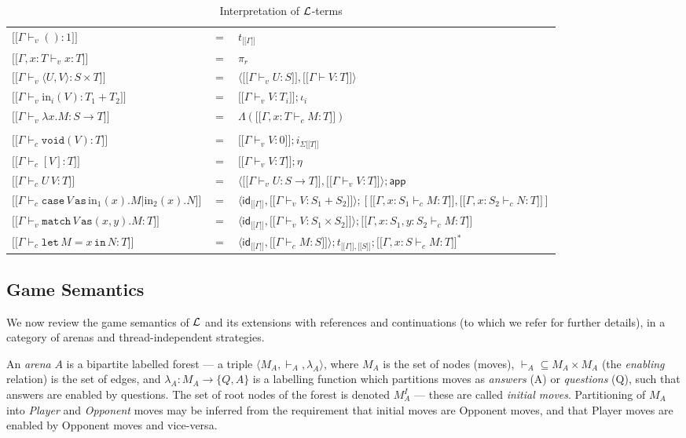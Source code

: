 \documentclass{eptcs}
\def\[{\ensuremath{[ \! [}}
\def\]{\ensuremath{] \! ]}}
\def\L{{\cal{L}}}
\newcommand{\cse}{{\mathtt{case}}}
\newcommand{\as}{{\mathtt{as}}}
\newcommand{\void}{{\mathtt{void}}}
\newcommand{\match}{{\mathtt{match}}}
\newcommand{\lett}{{\mathtt{let}}}
\newcommand{\spc}{\hspace{2pt}}
\newcommand{\inj}{\mathrm{in}}
\newcommand{\com}{{{1}}}
\newcommand{\id}{{\mathsf{id}}}
\newcommand{\app}{{\mathsf{app}}}
\newcommand{\inn}{{{\mathtt{in}}}}
\begin{document}
\begin{table}

\begin{tabular}{l c l}
$\[\Gamma \vdash_v ():\com\]$&$ =$&$ t_{\[\Gamma\]}$\\
$ \[\Gamma,x:T \vdash_v x:T\]$&$ = $&$\pi_r$\\ 
$\[\Gamma \vdash_v \langle U,V \rangle:   S\times T\]$&$ =$ &  $\langle \[\Gamma \vdash_v U:S \], \[\Gamma \vdash V:T\]\rangle$\\
$\[\Gamma \vdash_v \inj_i(V):T_1+ T_2\]$&$ =$&$ \[\Gamma \vdash_v V:T_i\];\iota_i$\\
$\[\Gamma \vdash_v \lambda x.M:S \rightarrow T\]$&$ =$&$ \Lambda(\[\Gamma,x:T \vdash_c  M:T\])$\\
\\
$\[\Gamma \vdash_c \void(V):T\]$&$ = $&$\[\Gamma \vdash_v V:0\];i_{\Sigma\[T\]}$\\
$\[\Gamma \vdash_c [V]:T\]$&$ = $&$\[\Gamma \vdash_v V:T\];\eta$\\
 $\[\Gamma \vdash_c U\spc V:T\]$&$ =$&$ \langle \[\Gamma \vdash_v U:S \rightarrow T\], \[\Gamma \vdash_v V:T\]\rangle;\app$\\
$\[\Gamma \vdash_c\cse \spc V\spc \as\spc \inj_1(x).M|\inj_2(x).N\]$&$ =$&$ \langle \id_{\[\Gamma\]}, \[\Gamma \vdash_v V:S_1 +S_2\]\rangle;[\[\Gamma,x:S_1 \vdash_c M:T\],\[\Gamma,x:S_2 \vdash_c N:T\]]$   \\
 $\[\Gamma \vdash_v \match \spc V\spc \as (x,y).M:T\]$&$ = $&$\langle\id_{\[\Gamma\]}, \[\Gamma \vdash_v V:S_1 \times S_2\]\rangle;\[\Gamma,x:S_1,y:S_2\vdash_c M:T\]$  \\
 $\[\Gamma \vdash_c \lett \spc M = x\spc \inn\spc N:T\]$&$ =$&$ \langle \id_{\[\Gamma\]},\[\Gamma \vdash_c M:S\]\rangle;t_{\[\Gamma\],\[S\]};\[\Gamma,x:S \vdash_c M:T\]^*$\\  
\end{tabular}
\caption{Interpretation of $\L$-terms}
\end{table}

\subsection{Game Semantics}
We now review the game semantics of $\L$ and its extensions with references \cite{AHM} and continuations \cite{LT} (to which we refer for further details), in a category of arenas and thread-independent strategies.  


An \emph{arena} $A$ is a bipartite labelled  forest --- a triple $\langle M_{A},\vdash_{A},\lambda_A \rangle$, where $M_A$ is the set of nodes (moves),  $\vdash_{A} \subseteq M_A \times M_{A}$ (the \emph{enabling} relation) is the set of edges, and $\lambda_A:M_{A} \rightarrow \{Q,A\}$ is a labelling function which partitions moves as  \emph{answers} (A) or \emph{questions} (Q), such that answers are enabled by questions. The set of root nodes of the forest is denoted $M^I_A$ --- these are called \emph{initial moves}.  
Partitioning of  $M_A$ into \emph{Player} and \emph{Opponent} moves may be inferred from the requirement that initial moves are Opponent moves, and that Player moves are enabled by Opponent moves and vice-versa. 
\end{document}
